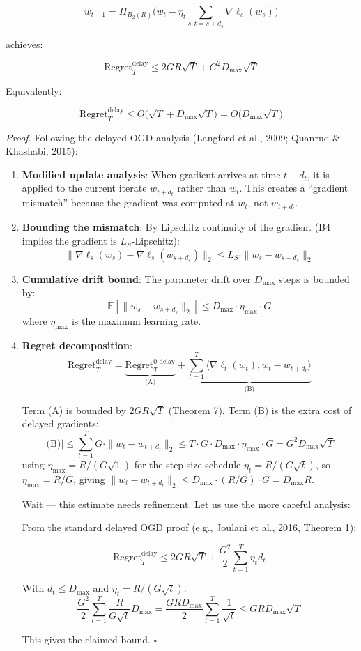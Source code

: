 \documentclass[
  12pt,
]{article}
\begin{document}
\[w_{t+1} = \Pi_{B_2(R)}\bigl( w_t - \eta_t \sum_{s: t = s + d_s} \nabla \ell_s(w_s) \bigr)\]

achieves:

\[\boxed{\;\text{Regret}_T^{\text{delay}} \leq 2GR\sqrt{T} + G^2 D_{\max} \sqrt{T}\;}\]

Equivalently:

\[\text{Regret}_T^{\text{delay}} \leq O\bigl( \sqrt{T} + D_{\max} \sqrt{T} \bigr) = O\bigl( D_{\max} \sqrt{T} \bigr)\]

\emph{Proof.} Following the delayed OGD analysis (Langford et al., 2009;
Quanrud \& Khashabi, 2015):

\begin{enumerate}
\def\labelenumi{\arabic{enumi}.}
\item
  \textbf{Modified update analysis}: When gradient arrives at time
  \(t + d_t\), it is applied to the current iterate \(w_{t+d_t}\) rather
  than \(w_t\). This creates a ``gradient mismatch'' because the
  gradient was computed at \(w_t\), not \(w_{t+d_t}\).
\item
  \textbf{Bounding the mismatch}: By Lipschitz continuity of the
  gradient (B4 implies the gradient is \(L_S\)-Lipschitz):
  \[\|\nabla \ell_s(w_s) - \nabla \ell_s(w_{s+d_s})\|_2 \leq L_S \cdot \|w_s - w_{s+d_s}\|_2\]
\item
  \textbf{Cumulative drift bound}: The parameter drift over \(D_{\max}\)
  steps is bounded by:
  \[\mathbb{E}[\|w_s - w_{s+d_s}\|_2] \leq D_{\max} \cdot \eta_{\max} \cdot G\]
  where \(\eta_{\max}\) is the maximum learning rate.
\item
  \textbf{Regret decomposition}:
  \[\text{Regret}_T^{\text{delay}} = \underbrace{\text{Regret}_T^{0\text{-delay}}}_{\text{(A)}} + \underbrace{\sum_{t=1}^T \langle \nabla \ell_t(w_t), w_t - w_{t+d_t} \rangle}_{\text{(B)}}\]

  Term (A) is bounded by \(2GR\sqrt{T}\) (Theorem 7). Term (B) is the
  extra cost of delayed gradients:
  \[|\text{(B)}| \leq \sum_{t=1}^T G \cdot \|w_t - w_{t+d_t}\|_2 \leq T \cdot G \cdot D_{\max} \cdot \eta_{\max} \cdot G = G^2 D_{\max} \sqrt{T}\]
  using \(\eta_{\max} = R/(G\sqrt{1})\) for the step size schedule
  \(\eta_t = R/(G\sqrt{t})\), so \(\eta_{\max} = R/G\), giving
  \(\|w_t - w_{t+d_t}\|_2 \leq D_{\max} \cdot (R/G) \cdot G = D_{\max} R\).

  Wait --- this estimate needs refinement. Let us use the more careful
  analysis:

  From the standard delayed OGD proof (e.g., Joulani et al., 2016,
  Theorem 1):

  \[\text{Regret}_T^{\text{delay}} \leq 2GR\sqrt{T} + \frac{G^2}{2} \sum_{t=1}^T \eta_t d_t\]

  With \(d_t \leq D_{\max}\) and \(\eta_t = R/(G\sqrt{t})\):
  \[\frac{G^2}{2} \sum_{t=1}^T \frac{R}{G\sqrt{t}} D_{\max} = \frac{G R D_{\max}}{2} \sum_{t=1}^T \frac{1}{\sqrt{t}} \leq G R D_{\max} \sqrt{T}\]

  This gives the claimed bound. \(\square\)
\end{enumerate}
\end{document}
